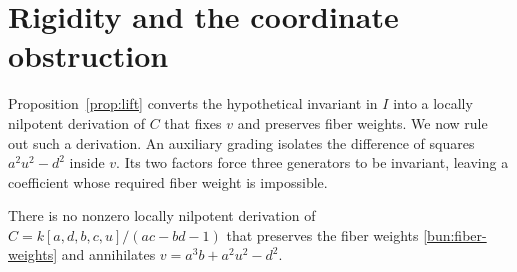 \section{Rigidity and the coordinate obstruction}\label{sec:rigidity}

Proposition~\ref{prop:lift} converts the hypothetical invariant in $I$ into
a locally nilpotent derivation of $C$ that fixes $v$ and preserves fiber
weights.  We now rule out such a derivation.  An auxiliary grading isolates
the difference of squares $a^2u^2-d^2$ inside $v$.  Its two factors force
three generators to be invariant, leaving a coefficient whose required
fiber weight is impossible.

\begin{proposition}\label{prop:rigidity}
There is no nonzero locally nilpotent derivation of
$C=k[a,d,b,c,u]/(ac-bd-1)$ that preserves the fiber weights
\eqref{bun:fiber-weights} and annihilates
$v=a^3b+a^2u^2-d^2$.
\end{proposition}

